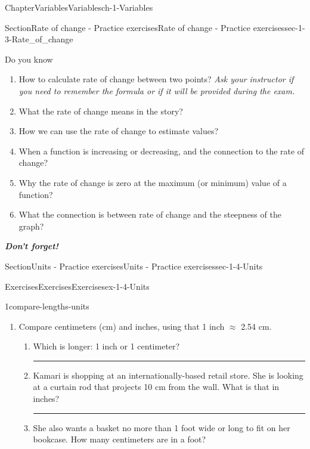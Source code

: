 \documentclass[twoside,11pt,]{book}
\newcommand{\alert}[1]{\textbf{\textit{#1}}}
\newlength{\workspacestrutwidth}
\numberwithin{equation}{section}
\begin{document}
\begin{chapterptx}{Chapter}{Variables}{}{Variables}{}{}{ch-1-Variables}
\begin{sectionptx}{Section}{Rate of change - Practice exercises}{}{Rate of change - Practice exercises}{}{}{sec-1-3-Rate_of_change}
\begin{conclusion}{Do you know \textellipsis{}}
\begin{enumerate}[label={\Alph*.}]
\item{}How to calculate rate of change between two points? \emph{Ask your instructor if you need to remember the formula or if it will be provided during the exam.}%
\item{}What the rate of change means in the story?%
\item{}How we can use the rate of change to estimate values?%
\item{}When a function is increasing or decreasing, and the connection to the rate of change?%
\item{}Why the rate of change is zero at the maximum (or minimum) value of a function?%
\item{}What the connection is between rate of change and the steepness of the graph?%
\end{enumerate}
%
\par
\alert{Don't forget!}%
\end{conclusion}%
\end{sectionptx}
%
%
\typeout{************************************************}
\typeout{************************************************}
%
\begin{sectionptx}{Section}{Units - Practice exercises}{}{Units - Practice exercises}{}{}{sec-1-4-Units}
%
%
\typeout{************************************************}
\typeout{************************************************}
%
\begin{exercises-subsection-numberless}{Exercises}{Exercises}{}{Exercises}{}{}{ex-1-4-Units}
\begin{divisionexercise}{1}{}{}{compare-lengths-units}%
\vspace{-\baselineskip-\parsep}%
\begin{enumerate}[label=(\alph*),ref=\alph*]%
\item{}Compare centimeters (cm) and inches, using that 1 inch \(\approx\) 2.54 cm.%
\begin{enumerate}[label=\roman*.,ref=\theenumi.\roman*]%
\item{}Which is longer: 1 inch or 1 centimeter?%
\par\rule{\workspacestrutwidth}{0cm}%
\item{}Kamari is shopping at an internationally-based retail store. She is looking at a curtain rod that projects 10 cm from the wall. What is that in inches?%
\par\rule{\workspacestrutwidth}{1cm}%
\item{}She also wants a basket no more than 1 foot wide or long to fit on her bookcase. How many centimeters are in a foot?%

\end{enumerate}
\end{enumerate}
\end{divisionexercise}
\end{exercises-subsection-numberless}
\end{sectionptx}
\end{chapterptx}
\end{document}
